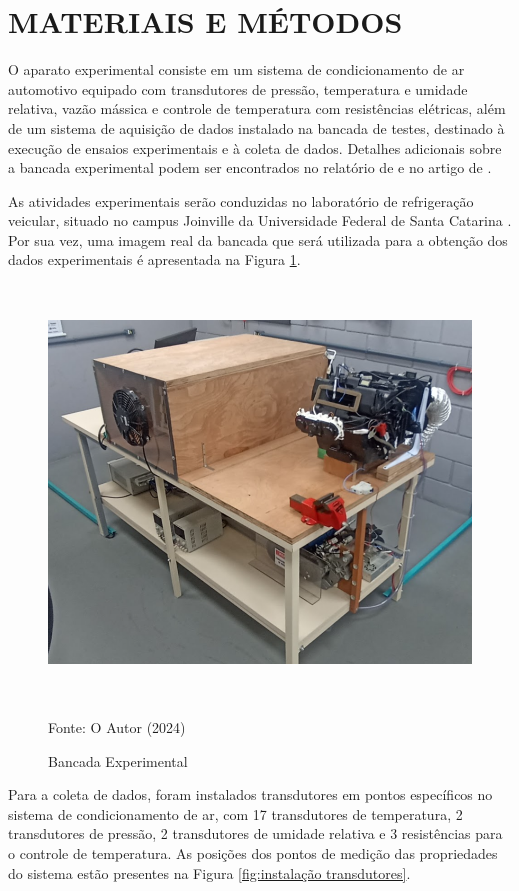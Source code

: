 \section[\MakeUppercase{Materiais e Métodos}]{\texorpdfstring{\MakeUppercase{Materiais e Métodos}}{MATERIAIS E MÉTODOS}}\label{sec:materiais e métodos}

O aparato experimental consiste em um sistema de condicionamento de ar automotivo equipado com transdutores de pressão, temperatura e umidade relativa, vazão mássica e controle de temperatura com resistências elétricas, além de um sistema de aquisição de dados instalado na bancada de testes, destinado à execução de ensaios experimentais e à coleta de dados. Detalhes adicionais sobre a bancada experimental podem ser encontrados no relatório de \textcite{deoliveira2023} e no artigo de \textcite{dasilva2024}.

As atividades experimentais serão conduzidas no laboratório de refrigeração veicular, situado no campus Joinville da Universidade Federal de Santa Catarina \cite{reve2023}. Por sua vez, uma imagem real da bancada que será utilizada para a obtenção dos dados experimentais é apresentada na Figura \ref{fig:bancada de teste}.

\begin{figure}[ht]
    \centering
     \caption{Bancada Experimental}
    \includegraphics[width=13.56cm, height=10.99cm]{FigurasdoTexto/Bancada Experimental.png}
    \vspace{5pt}  %
    
    {\footnotesize Fonte: O Autor (2024)}  %
    \label{fig:bancada de teste}
\end{figure}
\newpage
Para a coleta de dados, foram instalados transdutores em pontos específicos no sistema de condicionamento de ar, com 17 transdutores de temperatura, 2 transdutores de pressão, 2 transdutores de umidade relativa e 3 resistências para o controle de temperatura. As posições dos pontos de medição das propriedades do sistema estão presentes na Figura \ref{fig:instalação transdutores}. 

